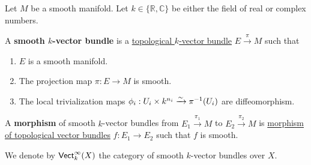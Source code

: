 \documentclass[../../../main]{subfiles}
\begin{document}
\begin{definition} \label{def:smooth-vector-bundle}
  Let \(M\) be a smooth manifold.
  Let \(k \in \{\mathbb{R}, \mathbb{C}\}\) be either the field of real or complex numbers.

  A \textbf{smooth \(k\)-vector bundle} is a \hyperref[def:topological-vector-bundle]{topological \(k\)-vector bundle} \(E \xrightarrow{\pi} M\) such that
  \begin{enumerate}
    \item \(E\) is a smooth manifold.
    \item The projection map \(\pi: E \to M\) is smooth.
    \item The local trivialization maps \(\phi_{i}: U_{i} \times k^{n_{i}} \xrightarrow{\sim} \pi^{-1}(U_{i})\) are diffeomorphism.
  \end{enumerate}

  
  A \textbf{morphism} of smooth \(k\)-vector bundles from \(E_{1} \xrightarrow{\pi_{1}} M\) to \(E_{2} \xrightarrow{\pi_{2}} M\) is \hyperref[def:topological-vector-bundle]{morphism of topological vector bundles} \(f: E_{1} \to E_{2}\) such that \(f\) is smooth.

  We denote by \(\mathsf{Vect}_{k}^{\infty}(X)\) the category of smooth \(k\)-vector bundles over \(X\).
\end{definition}
\end{document}
